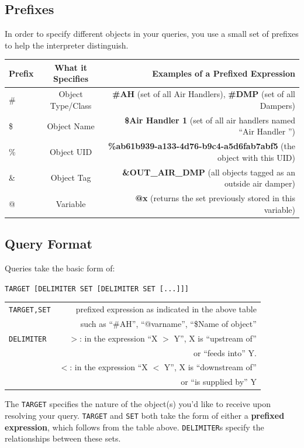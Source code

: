 \subsection{Prefixes} %
\label{sub:prefixes}
In order to specify different objects in your queries, you use a small set of prefixes to help the interpreter distinguish.
\begin{center}
\begin{tabular}{| l | c | r |}
\hline
Prefix & What it Specifies & Examples of a {\bf Prefixed Expression}  \\ \hline
\#	&	Object Type/Class & \textbf{\#AH} (set of all Air Handlers), \textbf{\#DMP} (set of all Dampers) \\ \hline
\$ 	&	Object Name	& \textbf{\$Air Handler 1} (set of all air handlers named ``Air Handler '') \\ \hline
\%	&	Object UID & \textbf{\%ab61b939-a133-4d76-b9c4-a5d6fab7abf5} (the object with this UID) \\ \hline
\&  &	Object Tag & \textbf{\&OUT\_AIR\_DMP} (all objects tagged as an outside air damper) \\ \hline
@	&	Variable	& \textbf{@x} (returns the set previously stored in this variable) \\ \hline
\end{tabular}
\end{center}

\subsection{Query Format} %
\label{sub:query_format}
Queries take the basic form of:
\begin{center}
\verb+TARGET [DELIMITER SET [DELIMITER SET [...]]]+

\verb++

\begin{tabular}{| l | r |}
\hline
\verb+TARGET,SET+ & prefixed expression as indicated in the above table \\
& such as ``\#AH'', ``@varname'', ``\$Name of object'' \\ \hline
\verb+DELIMITER+& $>$: in the expression ``X $>$ Y'', X is ``upstream of'' \\
& or ``feeds into'' Y. \\
& $<$: in the expression ``X $<$ Y'', X is ``downstream of'' \\
& or ``is supplied by'' Y \\ \hline
\end{tabular}
\end{center}
The \verb+TARGET+ specifies the nature of the object(s) you'd like to receive upon resolving your query. \verb+TARGET+ and \verb+SET+ both take the form of either a {\bf prefixed expression}, which follows from the table above. \verb+DELIMITER+s specify the relationships between these sets.
